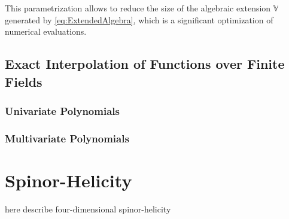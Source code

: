 This parametrization allows to reduce the size of the algebraic extension $\mathbb{V}$ generated by \cref{eq:ExtendedAlgebra},
which is a significant optimization of numerical evaluations.




\section{Exact Interpolation of Functions over Finite Fields}
\subsection{Univariate Polynomials}
\subsection{Multivariate Polynomials}




\chapter{Spinor-Helicity}
\label{chap:4dspinhel}

here describe four-dimensional spinor-helicity


